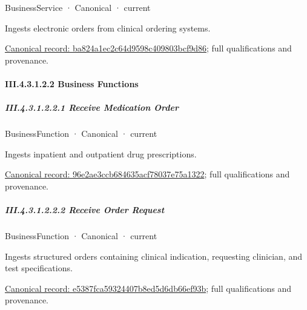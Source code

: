 \label{element:ba824a1ec2c64d9598c409803bcf9d86}
{\small BusinessService · Canonical · current}\par

Ingests electronic orders from clinical ordering systems.


{\footnotesize \href{../../../../../../../../continuum/business/business-service/ba824a1ec2c64d9598c409803bcf9d86.md}{Canonical record: ba824a1ec2c64d9598c409803bcf9d86}; full qualifications and provenance.}\par
\paragraph*{III.4.3.1.2.2 Business Functions}
\label{navigation:III.4.3.1.2.2}

\subparagraph*{III.4.3.1.2.2.1 Receive Medication Order}
\label{navigation:III.4.3.1.2.2.1}

\label{element:96e2ae3ccb684635acf78037e75a1322}
{\small BusinessFunction · Canonical · current}\par

Ingests inpatient and outpatient drug prescriptions.


{\footnotesize \href{../../../../../../../../continuum/business/business-function/96e2ae3ccb684635acf78037e75a1322.md}{Canonical record: 96e2ae3ccb684635acf78037e75a1322}; full qualifications and provenance.}\par
\subparagraph*{III.4.3.1.2.2.2 Receive Order Request}
\label{navigation:III.4.3.1.2.2.2}

\label{element:e5387fca59324407b8ed5d6db66ef93b}
{\small BusinessFunction · Canonical · current}\par

Ingests structured orders containing clinical indication, requesting clinician, and test specifications.


{\footnotesize \href{../../../../../../../../continuum/business/business-function/e5387fca59324407b8ed5d6db66ef93b.md}{Canonical record: e5387fca59324407b8ed5d6db66ef93b}; full qualifications and provenance.}\par
